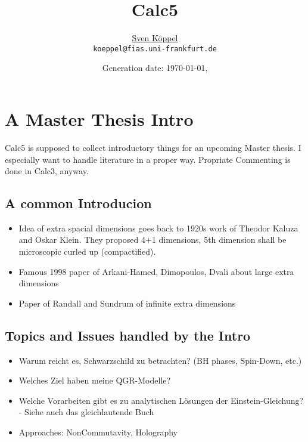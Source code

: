 \documentclass[10pt,a4paper, fleqn]{article}
\title{\vspace{-9ex} Calc5 \vspace{-1ex}} %
\author{\small %
\href{https://itp.uni-frankfurt.de/~koeppel}{Sven Köppel} \\
\small \texttt{koeppel@fias.uni-frankfurt.de}}
\date{\small Generation date: \today, \currenttime}
\begin{document}
\maketitle

\renewcommand{\d}{\mathrm{d}}
\newcommand{\dd}[2]{\frac{\mathrm{d} #1}{\mathrm{d} #2}}
\renewcommand{\L}{L_P}
\newcommand{\pr}{p_r}
\newcommand{\psenk}{p_\perp}
\newcommand{\ebenso}{\biggl( ~ \therefore ~ \biggr) }
\newcommand{\metrik}[1]{\d s^2 = \left( #1 \right) \d t^2 \left( #1 \right)^{-1} \d r^2 + r^2 \d \Omega_{D-2}^2 }
\newcommand{\winkel}{r^2 \d \Omega^2}
\newcommand{\dann}{$\rightarrow~$}

\section{A Master Thesis Intro}
Calc5 is supposed to collect introductory things for an upcoming Master thesis. I especially want to handle literature in a proper way. Propriate Commenting is done in Calc3, anyway.

\subsection{A common Introducion}
\begin{itemize}
\item Idea of extra spacial dimensions goes back to 1920s work of Theodor Kaluza and Oskar Klein. They proposed 4+1 dimensions, 5th dimension shall be microscopic curled up (compactified).
\item Famous 1998 paper of Arkani-Hamed, Dimopoulos, Dvali about large extra dimensions
\item Paper of Randall and Sundrum of infinite extra dimensions
\end{itemize}

\subsection{Topics and Issues handled by the Intro}
\begin{itemize}
\item Warum reicht es, Schwarzschild zu betrachten? (BH phases, Spin-Down, etc.)
\item Welches Ziel haben meine QGR-Modelle?
\item Welche Vorarbeiten gibt es zu analytischen Lösungen der Einstein-Gleichung? - Siehe auch das gleichlautende Buch
\item Approaches: NonCommutavity, Holography
\end{itemize}




\end{document}
